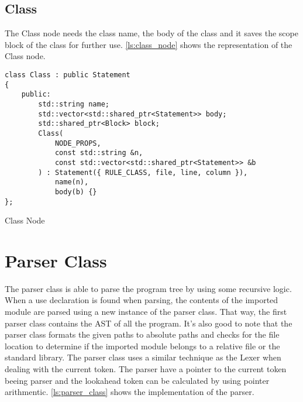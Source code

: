 \subsection{Class}

The Class node needs the class name, the body of the class and it saves the scope block of the class for further use.
\autoref{ls:class_node} shows the representation of the Class node.

\begin{listing}[H]
\begin{verbatim}
class Class : public Statement
{
    public:
        std::string name;
        std::vector<std::shared_ptr<Statement>> body;
        std::shared_ptr<Block> block;
        Class(
            NODE_PROPS,
            const std::string &n,
            const std::vector<std::shared_ptr<Statement>> &b
        ) : Statement({ RULE_CLASS, file, line, column }),
            name(n),
            body(b) {}
};
\end{verbatim}
\caption{Class Node}
\label{ls:class_node}
\end{listing}

\section{Parser Class}

The parser class is able to parse the program tree by using some recursive logic. When a use declaration is found when parsing,
the contents of the imported module are parsed using a new instance of the parser class. That way, the first parser class contains
the AST of all the program. It's also good to note that the parser class formats the given paths to absolute paths and checks for the
file location to determine if the imported module belongs to a relative file or the standard library. The parser class uses a similar technique
as the Lexer when dealing with the current token. The parser have a pointer to the current token beeing parser and the lookahead token can be
calculated by using pointer arithmentic. \autoref{ls:parser_class} shows the implementation of the parser.

